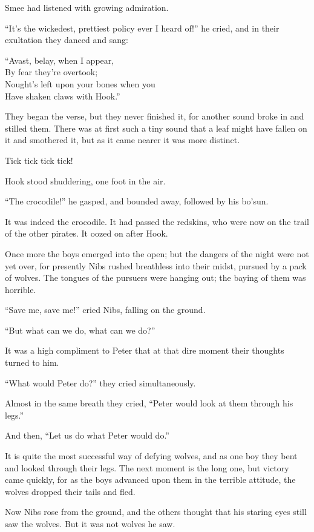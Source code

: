 Smee had listened with growing admiration.

``It's the wickedest, prettiest policy ever I heard of!'' he cried, and in their
exultation they danced and sang:

``Avast, belay, when I appear,\\
    By fear they're overtook;\\
Nought's left upon your bones when you\\
    Have shaken claws with Hook.''

They began the verse, but they never finished it, for another sound broke in and
stilled them.
There was at first such a tiny sound that a leaf might have fallen on it and
smothered it, but as it came nearer it was more distinct.

Tick tick tick tick!

Hook stood shuddering, one foot in the air.

``The crocodile!'' he gasped, and bounded away, followed by his bo'sun.

It was indeed the crocodile.
It had passed the redskins, who were now on the trail of the other pirates.
It oozed on after Hook.

Once more the boys emerged into the open; but the dangers of the night were not
yet over, for presently Nibs rushed breathless into their midst, pursued by a
pack of wolves.
The tongues of the pursuers were hanging out; the baying of them was horrible.

``Save me, save me!'' cried Nibs, falling on the ground.

``But what can we do, what can we do?''

It was a high compliment to Peter that at that dire moment their thoughts turned
to him.

``What would Peter do?'' they cried simultaneously.

Almost in the same breath they cried, ``Peter would look at them through his
legs.''

And then, ``Let us do what Peter would do.''

It is quite the most successful way of defying wolves, and as one boy they bent
and looked through their legs.
The next moment is the long one, but victory came quickly, for as the boys
advanced upon them in the terrible attitude, the wolves dropped their tails and
fled.

Now Nibs rose from the ground, and the others thought that his staring eyes
still saw the wolves.
But it was not wolves he saw.

